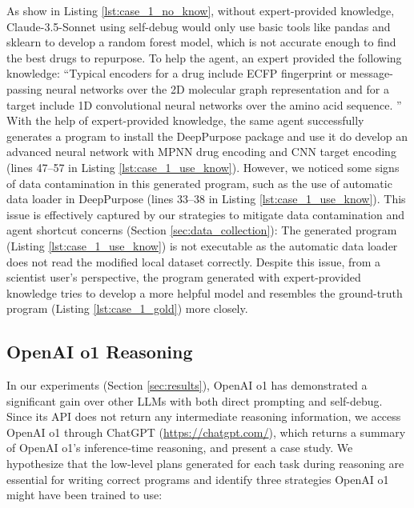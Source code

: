 As show in Listing \ref{lst:case_1_no_know}, without expert-provided knowledge, Claude-3.5-Sonnet using self-debug would only use basic tools like pandas and sklearn to develop a random forest model, which is not accurate enough to find the best drugs to repurpose.
To help the agent, an expert provided the following knowledge:
``Typical encoders for a drug include ECFP fingerprint or message-passing neural networks over the 2D molecular graph representation and for a target include 1D convolutional neural networks over the amino acid sequence. ''
With the help of expert-provided knowledge, the same agent successfully generates a program to install the DeepPurpose package and use it do develop an advanced neural network with MPNN drug encoding and CNN target encoding (lines 47--57 in Listing \ref{lst:case_1_use_know}).
However, we noticed some signs of data contamination in this generated program, such as the use of automatic data loader in DeepPurpose (lines 33--38 in Listing \ref{lst:case_1_use_know}).
This issue is effectively captured by our strategies to mitigate data contamination and agent shortcut concerns (Section \ref{sec:data_collection}): 
The generated program (Listing \ref{lst:case_1_use_know}) is not executable as the automatic data loader does not read the modified local dataset correctly.
Despite this issue, from a scientist user's perspective, the program generated with expert-provided knowledge tries to develop a more helpful model and resembles the ground-truth program (Listing \ref{lst:case_1_gold}) more closely.\\



\newpage
\subsection{OpenAI o1 Reasoning}
\label{app:case_3}

In our experiments (Section \ref{sec:results}), OpenAI o1 has demonstrated a significant gain over other LLMs with both direct prompting and self-debug.
Since its API does not return any intermediate reasoning information, we access OpenAI o1 through ChatGPT (\url{https://chatgpt.com/}), which returns a summary of OpenAI o1's inference-time reasoning, and present a case study. 
We hypothesize that the low-level plans generated for each task during reasoning are essential for writing correct programs and identify three strategies OpenAI o1 might have been trained to use:

